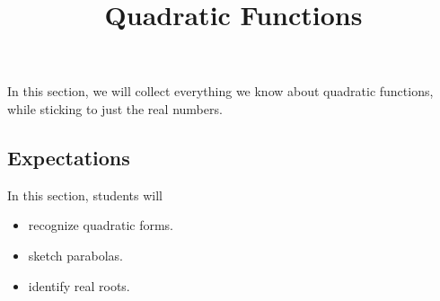 \documentclass{ximera}
\title{Quadratic Functions}
\begin{document}
\begin{abstract}
\end{abstract}
\maketitle





In this section, we will collect everything we know about quadratic functions, while sticking to just the real numbers.
















\subsection{Expectations}

\begin{sectionOutcomes}
In this section, students will 

\begin{itemize}
\item recognize quadratic forms.
\item sketch parabolas.
\item identify real roots.
\end{itemize}
\end{sectionOutcomes}
\end{document}
